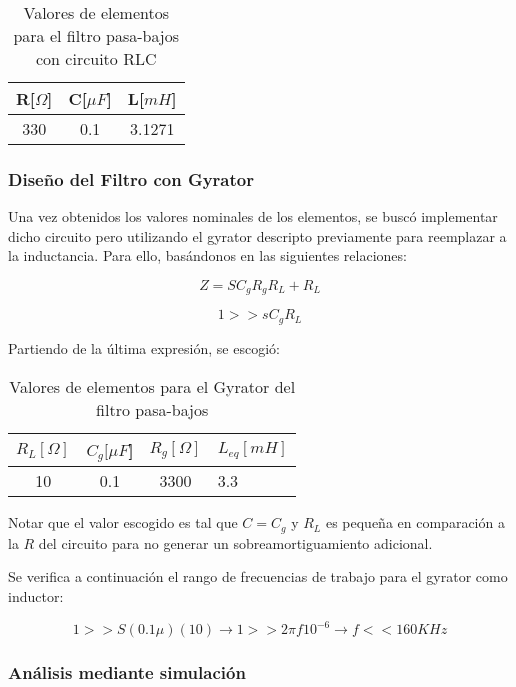 \begin{table}[H]
    \centering
    \begin{tabular}{|c|c|c|}
    \hline
    \rowcolor[HTML]{C0C0C0} 
    R[$\Omega$] & C[$\mu F$] & L[$mH$]  \\ \hline
    330      & 0.1  & 3.1271 \\ \hline
    \end{tabular}
    \caption{Valores de elementos para el filtro pasa-bajos con circuito RLC}
    \end{table}

\subsubsection{Diseño del Filtro con Gyrator}

Una vez obtenidos los valores nominales de los elementos, se buscó implementar dicho circuito pero utilizando el gyrator descripto previamente
para reemplazar a la inductancia. Para ello, basándonos 
en las siguientes relaciones:

$$Z=SC_gR_gR_L+R_L$$

$$1 >> sC_gR_L$$

Partiendo de la última expresión, se escogió:

\begin{table}[H]
    \centering
    \begin{tabular}{|c|c|c|l|}
    \hline
    \rowcolor[HTML]{C0C0C0} 
    $R_L[\Omega]$ & $C_g[\mu F$] & $R_g[\Omega]$  & $L_{eq}[mH]$ \\ \hline
     10       & 0.1  & 3300 & 3.3        \\ \hline
    \end{tabular}
    \caption{Valores de elementos para el Gyrator del filtro pasa-bajos}
    \end{table}


Notar que el valor escogido es tal que $C=C_g$ y $R_L$ es pequeña en comparación a la $R$ del circuito para no generar
un sobreamortiguamiento adicional.

Se verifica a continuación el rango de frecuencias de trabajo para el gyrator como inductor:

$$1 >> S(0.1 \mu )(10) \longrightarrow 1  >> 2 \pi f 10^{-6} \longrightarrow f << 160 KHz$$

\subsubsection{Análisis mediante simulación}

